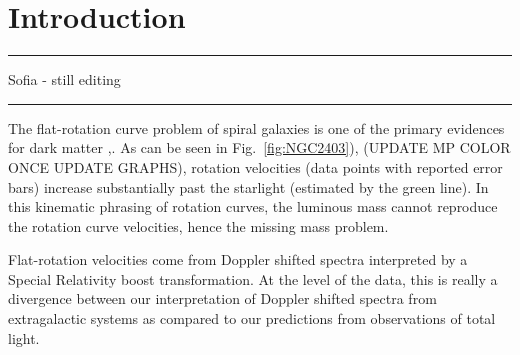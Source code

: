 \documentclass[reprint,%
 amsmath,amssymb,
 aps,
]{revtex4-1}
\begin{document}
\maketitle




\section{Introduction  \label{sec:uno}}
 {\color{teal} \rule{\linewidth}{0.5mm}}
 
 {\color{teal}Sofia - still editing}\\
 {\color{teal} \rule{\linewidth}{0.5mm}}
 
 The flat-rotation curve  problem of spiral galaxies is one of the primary evidences for dark matter \cite{Rub},\cite{Bosma}.  
 As can be seen in Fig.~\ref{fig:NGC2403}), (UPDATE MP COLOR ONCE UPDATE GRAPHS), rotation velocities (data points with reported error bars) increase substantially past the starlight (estimated by the green line). In this kinematic phrasing of rotation curves,  the luminous mass cannot reproduce the rotation curve velocities, hence the missing mass problem. 
 
 Flat-rotation velocities come  from Doppler shifted spectra  interpreted   by a Special Relativity boost transformation. At the level of the data, this is really a divergence between our interpretation of Doppler shifted spectra from extragalactic systems as compared to our predictions from observations of total light.  
 
\end{document}
